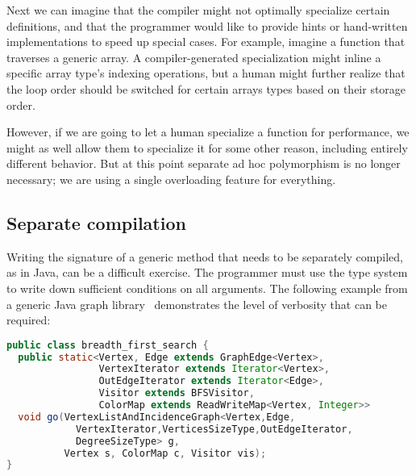 Next we can imagine that the compiler might not optimally specialize
certain definitions, and that the programmer would like to provide
hints or hand-written implementations to speed up special cases.
For example, imagine a function that traverses a generic array.
A compiler-generated specialization might inline a specific array type's
indexing operations, but a human might further realize that the loop order
should be switched for certain arrays types based on their storage order.

However, if we are going to let a human specialize a function for performance,
we might as well allow them to specialize it for some other reason, including
entirely different behavior.
But at this point separate ad hoc polymorphism is no longer necessary; we are
using a single overloading feature for everything.

\iffalse
Parametric polymorphism describes code that works for any object precisely
because it does not do anything meaningful to the object, for example the
identity function. In contrast, programming with tagged data (e.g.
symbolic expression systems, XML) permits code to work for any object
because every object has the same structure, allowing meaningful
operations.
\fi

\subsection{Separate compilation}

Writing the signature of a generic method that needs to be separately compiled,
as in Java, can be a difficult exercise.
The programmer must use the type system to write down sufficient conditions on all
arguments.
The following example from a generic Java graph
library~\cite{Garcia:2003:CSL:949305.949317} demonstrates the level of verbosity
that can be required:

\begin{singlespace}
\begin{lstlisting}[language=java,style=ttcode]
public class breadth_first_search {
  public static<Vertex, Edge extends GraphEdge<Vertex>,
                VertexIterator extends Iterator<Vertex>,
                OutEdgeIterator extends Iterator<Edge>,
                Visitor extends BFSVisitor,
                ColorMap extends ReadWriteMap<Vertex, Integer>>
  void go(VertexListAndIncidenceGraph<Vertex,Edge,
            VertexIterator,VerticesSizeType,OutEdgeIterator,
            DegreeSizeType> g,
          Vertex s, ColorMap c, Visitor vis);
}
\end{lstlisting}
\end{singlespace}

